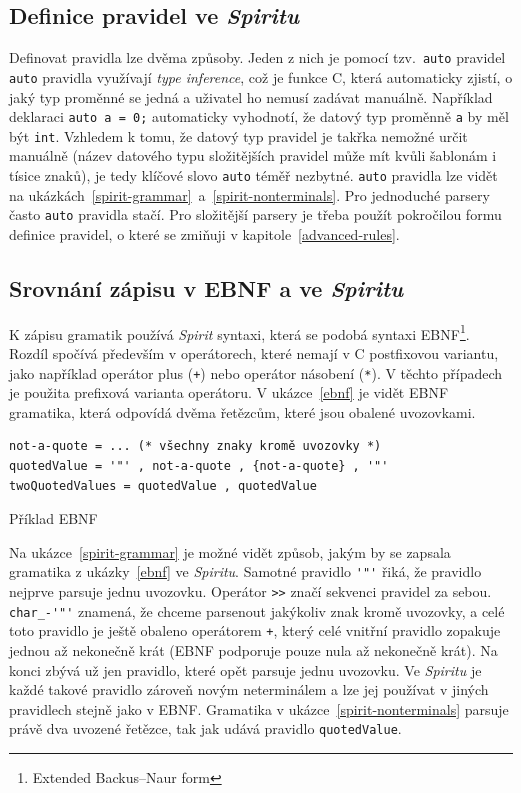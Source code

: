 \documentclass[thesis=B,czech,hidelinks]{FITthesis}[2019/03/06]
\newcommand{\Rplus}{\protect\hspace{-.1em}\protect\raisebox{.35ex}{\smaller{\smaller\textbf{+}}}}
\newcommand{\Cpp}{\mbox{C\Rplus\Rplus}\xspace}
\begin{document}
\subsection{Definice pravidel ve \textit{Spiritu}}
Definovat pravidla lze dvěma způsoby. Jeden z nich je pomocí tzv.\ \texttt{auto} pravidel \texttt{auto} pravidla využívají \textit{type inference}, což je funkce \Cpp{}, která automaticky zjistí, o jaký typ proměnné se jedná a uživatel ho nemusí zadávat manuálně. Například deklaraci \verb¨auto a = 0;¨ automaticky vyhodnotí, že datový typ proměnně \texttt{a} by měl být \texttt{int}. Vzhledem k tomu, že datový typ pravidel je takřka nemožné určit manuálně (název datového typu složitějších pravidel může mít kvůli šablonám i tísice znaků), je tedy klíčové slovo \texttt{auto} téměř nezbytné. \texttt{auto} pravidla lze vidět na ukázkách~\ref{spirit-grammar}~a~\ref{spirit-nonterminals}. Pro jednoduché parsery často \texttt{auto} pravidla stačí. Pro složitější parsery je třeba použít pokročilou formu definice pravidel, o které se zmiňuji v kapitole~\ref{advanced-rules}.

\subsection{Srovnání zápisu v EBNF a ve \textit{Spiritu}}
K zápisu gramatik používá \textit{Spirit} syntaxi, která se podobá syntaxi EBNF\footnote{Extended Backus--Naur form}. Rozdíl spočívá především v operátorech, které nemají v \Cpp{} postfixovou variantu, jako například operátor plus (\texttt{+}) nebo operátor násobení (\texttt{*}). V těchto případech je použita prefixová varianta operátoru. V ukázce~\ref{ebnf} je vidět EBNF gramatika, která odpovídá dvěma řetězcům, které jsou obalené uvozovkami.

\begin{listing}
\begin{verbatim}
not-a-quote = ... (* všechny znaky kromě uvozovky *)
quotedValue = '"' , not-a-quote , {not-a-quote} , '"'
twoQuotedValues = quotedValue , quotedValue
\end{verbatim}
\caption{Příklad EBNF}\label{ebnf}
\end{listing}

Na ukázce~\ref{spirit-grammar} je možné vidět způsob, jakým by se zapsala gramatika z ukázky~\ref{ebnf} ve \textit{Spiritu}. Samotné pravidlo \verb¨'"'¨ řiká, že pravidlo nejprve parsuje jednu uvozovku. Operátor \verb¨>>¨ značí sekvenci pravidel za sebou. \verb¨char_-'"'¨ znamená, že chceme parsenout jakýkoliv znak kromě uvozovky, a celé toto pravidlo je ještě obaleno operátorem \verb¨+¨, který celé vnitřní pravidlo zopakuje jednou až nekonečně krát (EBNF podporuje pouze nula až nekonečně krát). Na konci zbývá už jen pravidlo, které opět parsuje jednu uvozovku. Ve \textit{Spiritu} je každé takové pravidlo zároveň novým neterminálem a lze jej používat v jiných pravidlech stejně jako v EBNF\@. Gramatika v ukázce~\ref{spirit-nonterminals} parsuje právě dva uvozené řetězce, tak jak udává pravidlo \texttt{quotedValue}.
\end{document}
